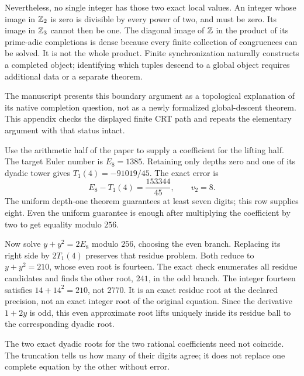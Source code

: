 Nevertheless, no single integer has those two exact local values. An integer whose image in $\mathbb Z_2$ is zero is divisible by every power of two, and must be zero. Its image in $\mathbb Z_3$ cannot then be one.
The diagonal image of $\mathbb Z$ in the product of its prime-adic completions is dense because every finite collection of congruences can be solved. It is not the whole product. Finite synchronization naturally constructs a completed object; identifying which tuples descend to a global object requires additional data or a separate theorem.

The manuscript presents this boundary argument as a topological explanation of its native completion question, not as a newly formalized global-descent theorem. This appendix checks the displayed finite CRT path and repeats the elementary argument with that status intact.

Use the arithmetic half of the paper to supply a coefficient for the lifting half. The target Euler number is $E_8=1385$. Retaining only depths zero and one of its dyadic tower gives $T_1(4)=-91019/45$.
The exact error is
\[
 E_8-T_1(4)=\frac{153344}{45},\qquad v_2=8.
\]
The uniform depth-one theorem guarantees at least seven digits; this row supplies eight. Even the uniform guarantee is enough after multiplying the coefficient by two to get equality modulo $256$.

Now solve $y+y^2=2E_8$ modulo $256$, choosing the even branch. Replacing its right side by $2T_1(4)$ preserves that residue problem. Both reduce to $y+y^2=210$, whose even root is fourteen. The exact check enumerates all residue candidates and finds the other root, $241$, in the odd branch.
The integer fourteen satisfies $14+14^2=210$, not $2770$. It is an exact residue root at the declared precision, not an exact integer root of the original equation. Since the derivative $1+2y$ is odd, this even approximate root lifts uniquely inside its residue ball to the corresponding dyadic root.

The two exact dyadic roots for the two rational coefficients need not coincide. The truncation tells us how many of their digits agree; it does not replace one complete equation by the other without error.

